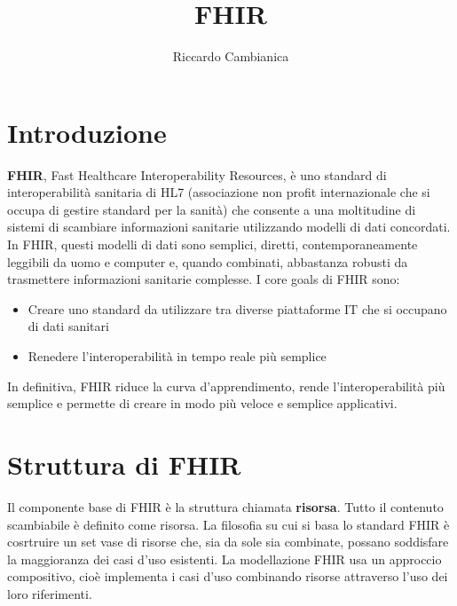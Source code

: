 \documentclass{article}
\title{FHIR}
\author{Riccardo Cambianica}
\begin{document}
\maketitle
\tableofcontents
\newpage

\section{Introduzione}

\textbf{FHIR}, Fast Healthcare Interoperability Resources, è uno standard di interoperabilità sanitaria di HL7 (associazione non profit internazionale che si occupa di gestire standard per la sanità)
 che consente a una moltitudine di sistemi di scambiare informazioni sanitarie utilizzando modelli di dati concordati. In FHIR, questi modelli di dati sono semplici, diretti, contemporaneamente
leggibili da uomo e computer e, quando combinati, abbastanza robusti da trasmettere informazioni sanitarie complesse.
I core goals di FHIR sono:
\begin{itemize}
    \item Creare uno standard da utilizzare tra diverse piattaforme IT che si occupano di dati sanitari
    \item Renedere l'interoperabilità in tempo reale più semplice
\end{itemize}
In definitiva, FHIR riduce la curva d'apprendimento, rende l'interoperabilità più semplice e permette di creare in modo più veloce e semplice applicativi.

\section{Struttura di FHIR}
Il componente base di FHIR è la struttura chiamata \textbf{risorsa}. Tutto il contenuto scambiabile è definito come risorsa.
La filosofia su cui si basa lo standard FHIR è cosrtruire un set vase di risorse che, sia da sole sia combinate, possano soddisfare la maggioranza dei casi d'uso esistenti.
La modellazione FHIR usa un approccio compositivo, cioè implementa i casi d'uso combinando risorse attraverso l'uso dei loro riferimenti.
\end{document}
